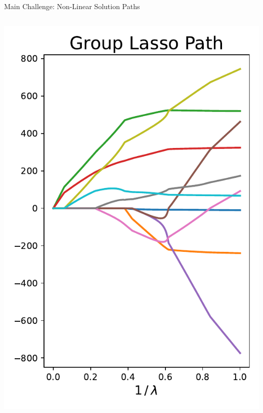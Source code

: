 \documentclass[usenames,dvipsnames,mathserif,notheorems]{beamer}
\begin{document}
\begin{frame}{Main Challenge: Non-Linear Solution Paths}
\begin{columns}
\begin{column}{0.5\textwidth}
			\includegraphics[width=\textwidth]{assets/group_lasso_path.pdf}
		\end{column}
	\end{columns}

\end{frame}
\end{document}
